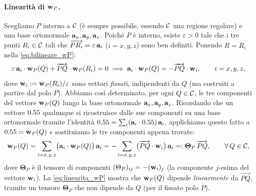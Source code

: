 \paragraph{Linearità di $\mathbf{w}_P$.}
Scegliamo $P$ interno a $\mathcal{C}$ (è sempre possibile, essendo $\mathcal{C}$ una regione regolare) e una base ortonormale $\mathbf{a}_x,\mathbf{a}_y,\mathbf{a}_z$. Poiché $P$ è interno, esiste $\varepsilon>0$ tale che i tre punti $R_i\in\mathcal{C}$ tali che $\overrightarrow{PR_i}=\varepsilon\,\mathbf{a}_i$ ($i=x,y,z$) sono ben definiti. Ponendo $R=R_i$ nella \eqref{eq:bilineare_wP}:
\begin{equation}
	\varepsilon\,\mathbf{a}_i\cdot \mathbf{w}_P(Q) + \overrightarrow{PQ}\cdot \mathbf{w}_P(R_i) = 0
	\;\Longrightarrow\;
	\mathbf{a}_i\cdot \mathbf{w}_P(Q) = -\overrightarrow{PQ}\cdot \mathbf{w}_i, \qquad i=x,y,z,
\end{equation}
dove $\mathbf{w}_i:=\mathbf{w}_P(R_i)/\varepsilon$ sono vettori \emph{fissati}, indipendenti da $Q$ (ma costruiti a partire dal polo $P$). 
Abbiamo così determinato, per ogni $Q\in\mathcal{C}$, le tre componenti del vettore $\mathbf{w}_P(Q)$ lungo la base ortonormale $\mathbf{a}_x,\mathbf{a}_y,\mathbf{a}_z$. Ricordando che un vettore $0.55$ qualunque si ricostruisce dalle sue componenti su una base ortonormale tramite l'identità $0.55=\sum_i(\mathbf{a}_i\cdot0.55)\,\mathbf{a}_i$, applichiamo questo fatto a $0.55=\mathbf{w}_P(Q)$ e sostituiamo le tre componenti appena trovate:
\begin{equation}\label{eq:linearita_wP}
	\mathbf{w}_P(Q) = \sum_{i=x,y,z}\bigl(\mathbf{a}_i\cdot\mathbf{w}_P(Q)\bigr)\,\mathbf{a}_i
	= -\sum_{i=x,y,z}\bigl(\overrightarrow{PQ}\cdot\mathbf{w}_i\bigr)\,\mathbf{a}_i
	=: \bm{\Theta}_P\,\overrightarrow{PQ}, \qquad \forall\, Q\in\mathcal{C},
\end{equation}
dove $\bm{\Theta}_P$ è il tensore di componenti $(\Theta_P)_{ij}=-(\mathbf{w}_i)_j$ (la componente $j$-esima del vettore $\mathbf{w}_i$).
La \eqref{eq:linearita_wP} mostra che $\mathbf{w}_P(Q)$ dipende \emph{linearmente} da $\overrightarrow{PQ}$, tramite un tensore $\bm{\Theta}_P$ che non dipende da $Q$ (per il fissato polo $P$). 


